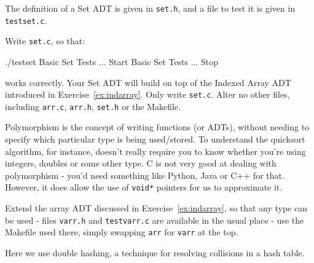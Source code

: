 
The definition of a Set ADT is given in \verb^set.h^, and a file to test it is given
in \verb^testset.c^.

\begin{exercise}
Write \verb^set.c^, so that:
{\small
\begin{terminaloutput}
./testset
Basic Set Tests ... Start
Basic Set Tests ... Stop
\end{terminaloutput}
}
\noindent works correctly. Your Set ADT will build on top of the Indexed Array ADT introduced in
Exercise~\ref{ex:indarray}.
Only write \verb^set.c^. Alter no other files, including \verb^arr.c^, \verb^arr.h^,
\verb^set.h^ or the Makefile.
\end{exercise}


Polymorphism is the concept of writing functions (or ADTs), without
needing to specify which particular type is being used/stored. To
understand the quicksort algorithm, for instance, doesn't really require
you to know whether you're using integers, doubles or some other type. C
is not very good at dealing with polymorphism - you'd need something
like Python, Java or C++ for that. However, it does allow the use of
\verb^void*^ pointers for us to approximate it.

\begin{exercise}
Extend the array ADT discussed in
Exercise~\ref{ex:indarray}, so that any type can be used - files
\verb^varr.h^ and \verb^testvarr.c^ are available in the usual place -
use the Makefile used there, simply swapping \verb^arr^ for \verb^varr^
at the top.
\end{exercise}

Here we use double hashing, a technique for resolving collisions in a
hash table.

